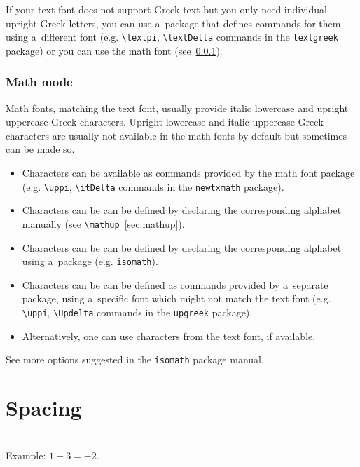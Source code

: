 \documentclass[12pt,a4paper]{article}
\begin{document}
If your text font does not support Greek text but you only need individual upright Greek letters, you can use a~package that defines commands for them using a~different font (e.g. \verb|\textpi|, \verb|\textDelta| commands in the \texttt{textgreek} package) or you can use the math font (see~\ref{subsec:greek-math}).

\subsubsection{Math mode}
\label{subsec:greek-math}

Math fonts, matching the text font, usually provide italic lowercase and upright uppercase Greek characters.
Upright lowercase and italic uppercase Greek characters are usually not available in the math fonts by default but sometimes can be made so.

\begin{itemize}
\item Characters can be available as commands provided by the math font package (e.g. \verb|\uppi|, \verb|\itDelta| commands in the \texttt{newtxmath} package).
\item Characters can be can be defined by declaring the corresponding alphabet manually (see \verb|\mathup|~\ref{sec:mathup}).
\item Characters can be can be defined by declaring the corresponding alphabet using a~package (e.g. \texttt{isomath}).
\item Characters can be can be defined as commands provided by a~separate package, using a~specific font which might not match the text font (e.g. \verb|\uppi|, \verb|\Updelta| commands in the \texttt{upgreek} package).
\item Alternatively, one can use characters from the text font, if available.
\end{itemize}

See more options suggested in the \texttt{isomath} package manual.

\section{Spacing}
\label{sec:spacing}

~\cite{iso-80000-1}\\
Example: $1-3=-2$.
\end{document}
